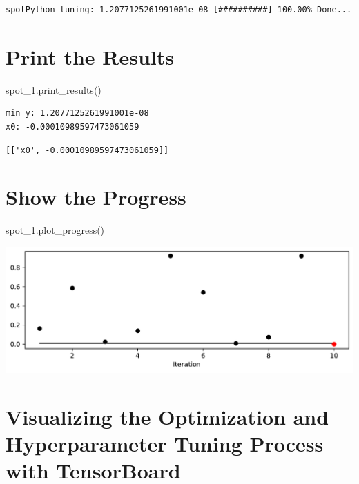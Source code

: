 \documentclass[
  letterpaper,
  DIV=11,
  numbers=noendperiod]{scrreprt}
\newenvironment{Shaded}{\begin{snugshade}}{\end{snugshade}}
\newcommand{\NormalTok}[1]{\textcolor[rgb]{0.00,0.23,0.31}{#1}}
\begin{document}
\begin{verbatim}
spotPython tuning: 1.2077125261991001e-08 [##########] 100.00% Done...
\end{verbatim}

\section{Print the Results}\label{print-the-results-1}

\begin{Shaded}
\begin{Highlighting}[]
\NormalTok{spot\_1.print\_results()}
\end{Highlighting}
\end{Shaded}

\begin{verbatim}
min y: 1.2077125261991001e-08
x0: -0.00010989597473061059
\end{verbatim}

\begin{verbatim}
[['x0', -0.00010989597473061059]]
\end{verbatim}

\section{Show the Progress}\label{show-the-progress-1}

\begin{Shaded}
\begin{Highlighting}[]
\NormalTok{spot\_1.plot\_progress()}
\end{Highlighting}
\end{Shaded}

\includegraphics{007_num_spot_intro_files/figure-pdf/cell-11-output-1.pdf}

\section{Visualizing the Optimization and Hyperparameter Tuning Process
with TensorBoard}\label{sec-visualizing-tensorboard-01}
\end{document}
